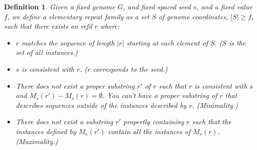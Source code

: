 \documentclass{article}
\newtheorem{definition}{Definition}
\begin{document}
\begin{definition}
  Given a fixed genome $G$, and fixed spaced seed
  $s$, and a fixed value $f$, we define a elementary repeat family as
  a set $S$ of genome coordinates, $|S| \geq f$, such that there
  exists an refd $r$ where:
  \begin{itemize}
  \item $r$ matches the sequence of length $|r|$ starting at each
    element of $S$.  ($S$ is the set of all instances.)
  \item $s$ is consistent with $r$.  ($r$ corresponds to the seed.)
  \item There does not exist a proper substring $r'$ of $r$ such that $r$
    is consistent with $s$ and $M_s(r') - M_s(r) = \emptyset$.  You
    can't have a proper substring of $r$ that describes sequences
    outside of the instances described by $r$.  (Minimality.)
  \item There does not exist a substring $r'$ propertly containing
      $r$ such that the instances defined by $M_s(r')$ contain all the
    instances of $M_s(r)$.  (Maximality.)
  \end{itemize}
\end{definition}
 
  
\end{document}
